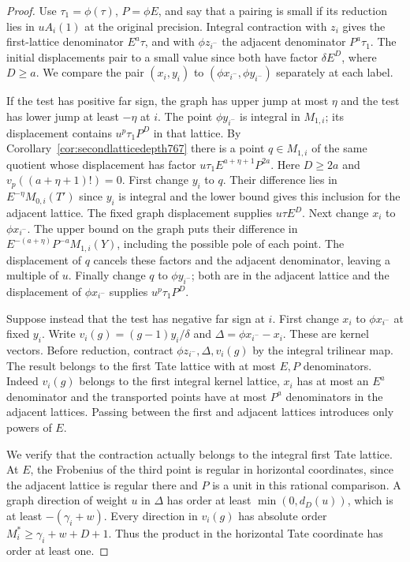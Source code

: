 \documentclass[a4paper,11pt]{article}
\theoremstyle{definition}
\theoremstyle{remark}
\numberwithin{equation}{section}
\begin{document}
\begin{proof}
Use \(\tau_1=\phi(\tau)\), \(P=\phi E\), and say that a
pairing is small if its reduction lies in \(uA_i(1)\) at
the original precision. Integral contraction with \(z_i\)
gives the first-lattice denominator \(E^a\tau\), and with
\(\phi z_{i^-}\) the adjacent denominator \(P^a\tau_1\).
The initial displacements pair to a small value since
both have factor \(\delta E^D\), where \(D\ge a\).
We compare the pair \((x_i,y_i)\) to
\((\phi x_{i^-},\phi y_{i^-})\) separately at each label.

If the test has positive far sign, the graph has upper
jump at most \(\eta\) and the test has lower jump at least
\(-\eta\) at \(i\). The point \(\phi y_{i^-}\) is integral
in \(M_{1,i}\); its displacement contains
\(u^p\tau_1 P^D\) in that lattice. By
Corollary~\ref{cor:secondlatticedepth767} there is a point
\(q\in M_{1,i}\) of the same quotient whose displacement
has factor \(u\tau_1 E^{a+\eta+1}P^{2a}\). Here \(D\ge2a\)
and \(v_p((a+\eta+1)!)=0\). First change \(y_i\) to \(q\).
Their difference lies in \(E^{-\eta}M_{0,i}(T')\) since
\(y_i\) is integral and the lower bound gives this inclusion
for the adjacent lattice. The fixed graph displacement
supplies \(u\tau E^D\). Next change \(x_i\) to
\(\phi x_{i^-}\). The upper bound on the graph puts their
difference in \(E^{-(a+\eta)}P^{-a}M_{1,i}(Y)\), including
the possible pole of each point. The displacement of \(q\)
cancels these factors and the adjacent denominator, leaving
a multiple of \(u\). Finally change \(q\) to \(\phi y_{i^-}\);
both are in the adjacent lattice and the displacement
of \(\phi x_{i^-}\) supplies \(u^p\tau_1P^D\).

Suppose instead that the test has negative far sign at \(i\).
First change \(x_i\) to \(\phi x_{i^-}\) at fixed \(y_i\).
Write \(v_i(g)=(g-1)y_i/\delta\) and
\(\Delta=\phi x_{i^-}-x_i\). These are kernel vectors.
Before reduction, contract \(\phi z_{i^-},\Delta,v_i(g)\)
by the integral trilinear map. The result belongs to the
first Tate lattice with at most \(E,P\) denominators.
Indeed \(v_i(g)\) belongs to the first integral kernel
lattice, \(x_i\) has at most an \(E^a\) denominator and
the transported points have at most \(P^a\) denominators
in the adjacent lattices. Passing between the first and
adjacent lattices introduces only powers of \(E\).

We verify that the contraction actually belongs to the
integral first Tate lattice. At \(E\), the Frobenius of
the third point is regular in horizontal coordinates, since
the adjacent lattice is regular there and \(P\) is a unit
in this rational comparison. A graph direction of weight
\(u\) in \(\Delta\) has order at least \(\min(0,d_D(u))\),
which is at least \(-(\gamma_i+w)\). Every direction in
\(v_i(g)\) has absolute order
\(M_i^*\ge\gamma_i+w+D+1\). Thus the product in the
horizontal Tate coordinate has order at least one.


\end{proof}
\end{document}
